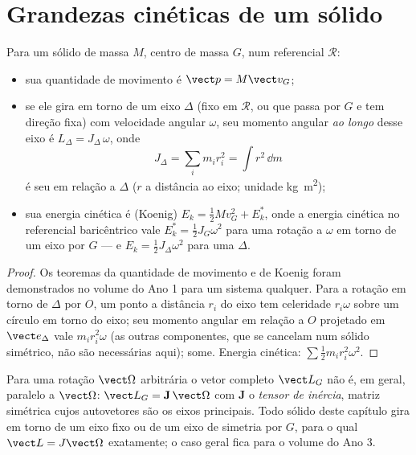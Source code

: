 \section{Grandezas cinéticas de um sólido}

\begin{proposition}\label{prop:b2:rigid-body-mechanics:kinetic}
Para um sólido de massa $M$, centro de massa $G$, num referencial $\mathcal R$:
\begin{itemize}
  \item sua quantidade de movimento é $\vect p = M\vect v_G$;
  \item se ele gira em torno de um eixo $\Delta$ (fixo em $\mathcal R$, ou
        que passa por $G$ e tem direção fixa) com velocidade angular
        $\omega$, seu momento angular \emph{ao longo} desse eixo é
        $L_\Delta = J_\Delta\,\omega$, onde
        \[
        J_\Delta = \sum_i m_i r_i^2 = \int r^2\,\dd m
        \]
        é seu \emph{} em relação a $\Delta$ ($r$ a distância ao
        eixo; unidade \unit{kg.m^2});
  \item sua energia cinética é (Koenig) $E_k = \tfrac12Mv_G^2 +
        E_k^*$, onde a energia cinética no referencial baricêntrico vale
        $E_k^* = \tfrac12J_{G}\omega^2$ para uma rotação a $\omega$ em torno de
        um eixo por $G$ --- e $E_k = \tfrac12J_\Delta\omega^2$ para uma
         $\Delta$.
\end{itemize}
\end{proposition}

\begin{proof}
Os teoremas da quantidade de movimento e de Koenig foram demonstrados
no volume do Ano 1 para um sistema qualquer. Para a rotação em torno de
$\Delta$ por $O$, um ponto a distância $r_i$ do eixo tem celeridade
$r_i\omega$ sobre um círculo em torno do eixo; seu momento angular em
relação a $O$ projetado em $\vect e_\Delta$ vale $m_ir_i^2\omega$ (as
outras componentes, que se cancelam num sólido simétrico, não são
necessárias aqui); some. Energia cinética: $\sum\tfrac12m_ir_i^2
\omega^2$.
\end{proof}

\begin{remark}\label{rem:b2:rigid-body-mechanics:tensor}
Para uma rotação $\vect\Omega$ arbitrária o vetor completo $\vect L_G$
não é, em geral, paralelo a $\vect\Omega$: $\vect L_G = \mathbf J\,\vect\Omega$
com $\mathbf J$ o \emph{tensor de inércia}, matriz simétrica cujos
autovetores são os eixos principais. Todo sólido deste capítulo gira em
torno de um eixo fixo ou de um eixo de simetria por $G$, para o qual
$\vect L = J\vect\Omega$ exatamente; o caso geral fica para o volume do
Ano 3.
\end{remark}

